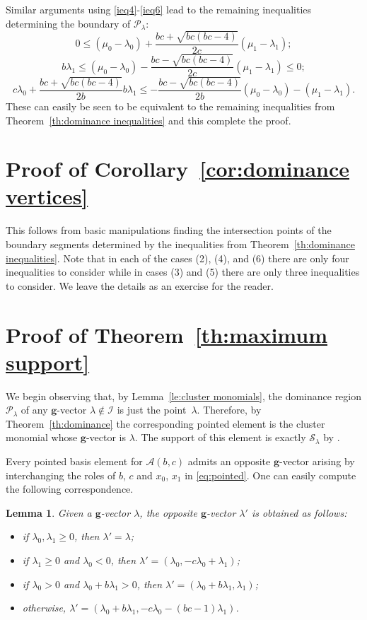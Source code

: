 \documentclass{amsart}
\newtheorem{lemma}[theorem]{Lemma}
\numberwithin{theorem}{section}
\newcommand{\bfg}{\boldsymbol{g}}
\newcommand{\cA}{\mathcal{A}}
\newcommand{\cI}{\mathcal{I}}
\newcommand{\cP}{\mathcal{P}}
\newcommand{\cS}{\mathcal{S}}
\begin{document}
  Similar arguments using \eqref{ieq4}-\eqref{ieq6} lead to the remaining inequalities determining the boundary of $\cP_\lambda$:
  \[ 0 \le (\mu_0-\lambda_0)+\frac{bc+\sqrt{bc(bc-4)}}{2c}(\mu_1-\lambda_1);\]
  \[ b\lambda_1 \le (\mu_0-\lambda_0)-\frac{bc-\sqrt{bc(bc-4)}}{2c}(\mu_1-\lambda_1) \le 0;\]
  \[ c\lambda_0+\frac{bc+\sqrt{bc(bc-4)}}{2b}b\lambda_1 \le -\frac{bc-\sqrt{bc(bc-4)}}{2b}(\mu_0-\lambda_0)-(\mu_1-\lambda_1).\]
  These can easily be seen to be equivalent to the remaining inequalities from Theorem~\ref{th:dominance inequalities} and this complete the proof.


\section{Proof of Corollary~\ref{cor:dominance vertices}}
\label{sec:dominance vertices}

  This follows from basic manipulations finding the intersection points of the boundary segments determined by the inequalities from Theorem~\ref{th:dominance inequalities}.
  Note that in each of the cases (2), (4), and (6) there are only four inequalities to consider while in cases (3) and (5) there are only three inequalities to consider.
  We leave the details as an exercise for the reader.


\section{Proof of Theorem~\ref{th:maximum support}}
\label{sec:maximum support} 
  
  We begin observing that, by Lemma~\ref{le:cluster monomials}, the dominance region $\cP_\lambda$ of any $\bfg$-vector $\lambda\not\in\cI$ is just the point~$\lambda$.
  Therefore, by Theorem~\ref{th:dominance} the corresponding pointed element is the cluster monomial whose $\bfg$-vector is $\lambda$. 
  The support of this element is exactly $\cS_\lambda$ by \cite[Proposition 4.1]{LLZ14}.
  
  Every pointed basis element for $\cA(b,c)$ admits an opposite $\bfg$-vector arising by interchanging the roles of $b$, $c$ and $x_0$, $x_1$ in \eqref{eq:pointed}. 
  One can easily compute the following correspondence.
  \begin{lemma}
    Given a $\bfg$-vector $\lambda$, the opposite $\bfg$-vector $\lambda'$ is obtained as follows:
    \begin{itemize}
      \item if $\lambda_0,\lambda_1\ge0$, then $\lambda'=\lambda$;
      \item if $\lambda_1\ge0$ and $\lambda_0<0$, then $\lambda'=(\lambda_0,-c\lambda_0+\lambda_1)$;
      \item if $\lambda_0>0$ and $\lambda_0+b\lambda_1>0$, then $\lambda'=(\lambda_0+b\lambda_1,\lambda_1)$;
      \item otherwise, $\lambda'=(\lambda_0+b\lambda_1,-c\lambda_0-(bc-1)\lambda_1)$.
    \end{itemize}
  \end{lemma}
\end{document}
